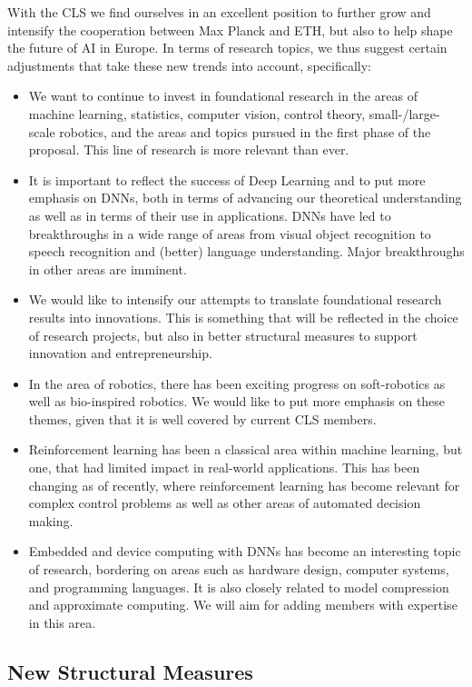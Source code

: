 \documentclass{article}
\begin{document}
With the CLS we find ourselves in an excellent position to further grow and intensify the cooperation between Max Planck and ETH, but also to help shape the future of AI in Europe. In terms of research topics, we thus suggest certain adjustments that take these new trends into account, specifically:  
\begin{itemize}
\item We want to continue to invest in foundational research in the areas of machine learning, statistics, computer vision, control theory, small-/large-scale robotics, and the areas and topics pursued in the first phase of the proposal. This line of research is more relevant than ever. 
\item It is important to reflect the success of Deep Learning and to put more emphasis on DNNs, both in terms of advancing our theoretical understanding as well as in terms of their use in applications. DNNs have led to breakthroughs in a wide range of areas from visual object recognition to speech recognition and (better) language understanding. Major breakthroughs in other areas are imminent.
\item We would like to intensify our attempts to translate foundational research results into innovations. This is something that will be reflected in the choice of research projects, but also in better structural measures to support innovation and entrepreneurship.  
\item In the area of robotics, there has been exciting progress on soft-robotics as well as bio-inspired robotics. We would like to put more emphasis on these themes, given that it is well covered by current CLS members. 
\item Reinforcement learning has been a classical area within machine learning, but one, that had limited impact in real-world applications. This has been changing as of recently, where reinforcement learning has become relevant for complex control problems as well as other areas of automated decision making. 
\item  Embedded and device computing with DNNs has become an interesting topic of research, bordering on areas such as hardware design, computer systems, and programming languages. It is also closely related to model compression and approximate computing. We will aim for adding members with expertise in this area. 
\end{itemize}

\subsection{New Structural Measures}
\end{document}
